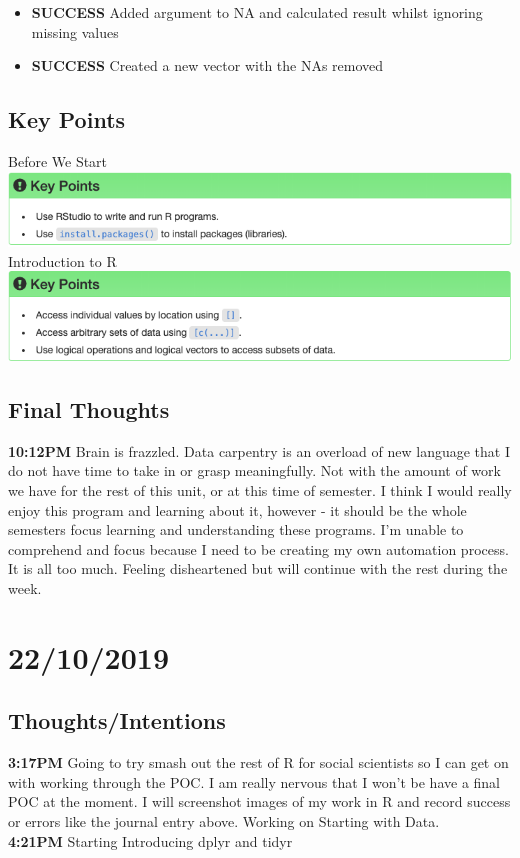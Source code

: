 \documentclass{article}
\begin{document}
\begin{itemize}
\item \textbf{SUCCESS} Added argument to NA and calculated result whilst ignoring missing values
\item \textbf{SUCCESS} Created a new vector with the NAs removed
\end{itemize}

\subsection{Key Points}
Before We Start \\
\includegraphics[width=\textwidth]{Images/RStudio_2.png} \\
Introduction to R \\
\includegraphics[width=\textwidth]{Images/RStudio_8.png} \\

\subsection{Final Thoughts}
\textbf{10:12PM} Brain is frazzled. Data carpentry is an overload of new language that I do not have time to take in or grasp meaningfully. Not with the amount of work we have for the rest of this unit, or at this time of semester. I think I would really enjoy this program and learning about it, however - it should be the whole semesters focus learning and understanding these programs. I'm unable to comprehend and focus because I need to be creating my own automation process. It is all too much. Feeling disheartened but will continue with the rest during the week. 


\section{22/10/2019}
\subsection{Thoughts/Intentions}
\textbf{3:17PM} Going to try smash out the rest of R for social scientists so I can get on with working through the POC. I am really nervous that I won't be have a final POC at the moment. I will screenshot images of my work in R and record success or errors like the journal entry above. Working on Starting with Data. \\
\textbf{4:21PM} Starting Introducing dplyr and tidyr
\end{document}
